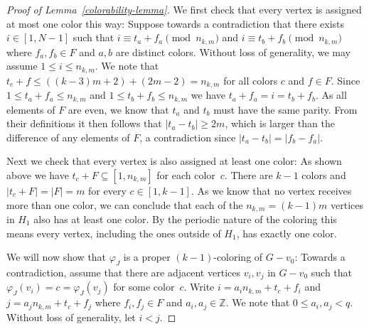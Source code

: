 \documentclass[a4paper,10pt,hidelinks]{amsart}
\theoremstyle{definition}
\begin{document}
\begin{proof}[Proof of Lemma~\ref{colorability-lemma}]
    We first check that every vertex is assigned at most one color this way: Suppose towards a contradiction that there exists $i \in [1, N-1]$ such that $i \equiv t_a + f_a \pmod{n_{k, m}}$ and $i \equiv t_b + f_b \pmod{n_{k, m}}$ where $f_a, f_b \in F$ and $a, b$ are distinct colors. Without loss of generality, we may assume $1 \leq i \leq n_{k, m}$. We note that $t_c + f \leq ((k-3)m + 2) + (2m - 2) = n_{k,m}$ for all colors $c$ and $f \in F$. Since $1 \leq t_a + f_a \leq n_{k, m}$ and $1 \leq t_b + f_b \leq n_{k,m}$ we have $t_a + f_a = i = t_b + f_b$. As all elements of $F$ are even, we know that $t_a$ and $t_b$ must have the same parity. From their definitions it then follows that $|t_a - t_b| \geq 2m$, which is larger than the difference of any elements of $F$, a contradiction since $|t_a-t_b| = |f_b - f_a|$.

    Next we check that every vertex is also assigned at least one color: As shown above we have $t_c + F \subseteq [1, n_{k, m}]$ for each color~$c$. There are $k-1$ colors and $|t_c+F|=|F|=m$ for every $c\in [1,k-1]$. As we know that no vertex receives more than one color, we can conclude that each of the $n_{k,m} = (k-1)m$ vertices in $H_1$ also has at least one color. By the periodic nature of the coloring this means every vertex, including the ones outside of $H_1$, has exactly one color.


    We will now show that $\varphi_J$ is a proper $(k-1)$-coloring of $G - v_0$: Towards a contradiction, assume that there are adjacent vertices $v_i, v_j$ in $G - v_0$ such that $\varphi_J(v_i) = c = \varphi_J(v_j)$ for some color~$c$. Write $i = a_i n_{k,m} + t_c + f_i$ and $j = a_j n_{k, m} + t_c + f_j$ where $f_i, f_j \in F$ and $a_i, a_j \in \mathbb{Z}$. We note that $0 \leq a_i, a_j < q$. Without loss of generality, let $i < j$. 
    

\end{proof}
\end{document}
